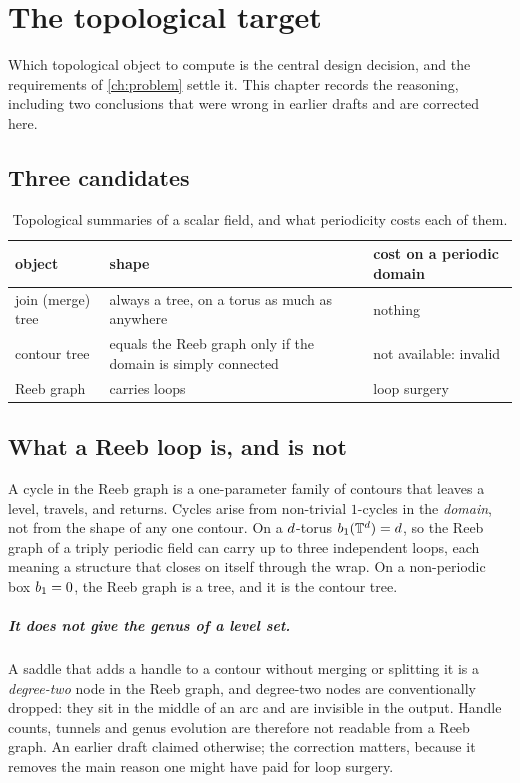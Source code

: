 \chapter{The topological target}
\label{ch:topology}

Which topological object to compute is the central design decision, and the
requirements of \cref{ch:problem} settle it. This chapter records the reasoning,
including two conclusions that were wrong in earlier drafts and are corrected
here.

\section{Three candidates}

\begin{table}[htbp]
\centering
\caption{Topological summaries of a scalar field, and what periodicity costs
  each of them.}
\label{tab:candidates}
\begin{tabular}{p{}p{}p{}}
\toprule
object & shape & cost on a periodic domain \\
\midrule
join (merge) tree &
  always a tree, on a torus as much as anywhere &
  nothing \\
contour tree &
  equals the Reeb graph only if the domain is simply connected &
  not available: invalid \\
Reeb graph &
  carries loops &
  loop surgery~\cite{tierny2009loopsurgery} \\
\bottomrule
\end{tabular}
\end{table}

\section{What a Reeb loop is, and is not}

A cycle in the Reeb graph is a one-parameter family of contours that leaves a
level, travels, and returns. Cycles arise from non-trivial $1$-cycles in the
\emph{domain}, not from the shape of any one contour. On a $d$-torus
$b_{1}(\mathbb{T}^{d}) = d$, so the Reeb graph of a triply periodic field can
carry up to three independent loops, each meaning a structure that closes on
itself through the wrap. On a non-periodic box $b_{1} = 0$, the Reeb graph is
a tree, and it is the contour tree.

\paragraph{It does not give the genus of a level set.} A saddle that adds a
handle to a contour without merging or splitting it is a \emph{degree-two} node
in the Reeb graph, and degree-two nodes are conventionally dropped: they sit in
the middle of an arc and are invisible in the output. Handle counts, tunnels and
genus evolution are therefore not readable from a Reeb graph. An earlier draft
claimed otherwise; the correction matters, because it removes the main reason
one might have paid for loop surgery.

